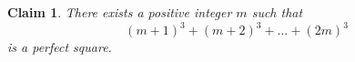 \documentclass{article}
\newtheorem*{claim}{Claim}
\begin{document}
\begin{claim} %
    There exists a positive integer $m$ such that
    \[
    (m+1)^3 + (m+2)^3 + \dots + (2m)^3
    \]
    is a perfect square.
\end{claim}
\end{document}
